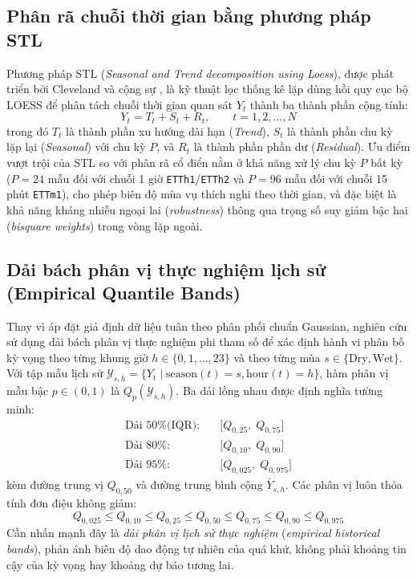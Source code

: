 \documentclass[12pt,a4paper,oneside]{report}
\newcommand{\code}[1]{\texttt{#1}}
\begin{document}
\subsection{Phân rã chuỗi thời gian bằng phương pháp STL}

Phương pháp STL (\textit{Seasonal and Trend decomposition using Loess}), được phát triển bởi Cleveland và cộng sự \cite{cleveland1990stl}, là kỹ thuật lọc thống kê lặp dùng hồi quy cục bộ LOESS để phân tách chuỗi thời gian quan sát $Y_t$ thành ba thành phần cộng tính:
\begin{equation}
  Y_t = T_t + S_t + R_t, \qquad t = 1, 2, \dots, N
\end{equation}
trong đó $T_t$ là thành phần xu hướng dài hạn (\textit{Trend}), $S_t$ là thành phần chu kỳ lặp lại (\textit{Seasonal}) với chu kỳ $P$, và $R_t$ là thành phần phần dư (\textit{Residual}). Ưu điểm vượt trội của STL so với phân rã cổ điển nằm ở khả năng xử lý chu kỳ $P$ bất kỳ ($P = 24$ mẫu đối với chuỗi 1 giờ \code{ETTh1}/\code{ETTh2} và $P = 96$ mẫu đối với chuỗi 15 phút \code{ETTm1}), cho phép biên độ mùa vụ thích nghi theo thời gian, và đặc biệt là khả năng kháng nhiễu ngoại lai (\textit{robustness}) thông qua trọng số suy giảm bậc hai (\textit{bisquare weights}) trong vòng lặp ngoài.

\subsection{Dải bách phân vị thực nghiệm lịch sử (Empirical Quantile Bands)}

Thay vì áp đặt giả định dữ liệu tuân theo phân phối chuẩn Gaussian, nghiên cứu sử dụng dải bách phân vị thực nghiệm phi tham số để xác định hành vi phân bố kỳ vọng theo từng khung giờ $h \in \{0, 1, \dots, 23\}$ và theo từng mùa $s \in \{\text{Dry}, \text{Wet}\}$. Với tập mẫu lịch sử $\mathcal{Y}_{s,h} = \{Y_t \mid \text{season}(t)=s, \text{hour}(t)=h\}$, hàm phân vị mẫu bậc $p \in (0,1)$ là $Q_p(\mathcal{Y}_{s,h})$. Ba dải lồng nhau được định nghĩa tường minh:
\begin{align}
  \text{Dải 50\% (IQR):} &\quad \bigl[Q_{0,25},\; Q_{0,75}\bigr] \\
  \text{Dải 80\%:}       &\quad \bigl[Q_{0,10},\; Q_{0,90}\bigr] \\
  \text{Dải 95\%:}       &\quad \bigl[Q_{0,025},\; Q_{0,975}\bigr]
\end{align}
kèm đường trung vị $Q_{0,50}$ và đường trung bình cộng $\bar{Y}_{s,h}$. Các phân vị luôn thỏa tính đơn điệu không giảm:
\begin{equation}
  Q_{0,025} \le Q_{0,10} \le Q_{0,25} \le Q_{0,50} \le Q_{0,75} \le Q_{0,90} \le Q_{0,975}
\end{equation}
Cần nhấn mạnh đây là \textit{dải phân vị lịch sử thực nghiệm} (\textit{empirical historical bands}), phản ánh biên độ dao động tự nhiên của quá khứ, không phải khoảng tin cậy của kỳ vọng hay khoảng dự báo tương lai.
\end{document}

